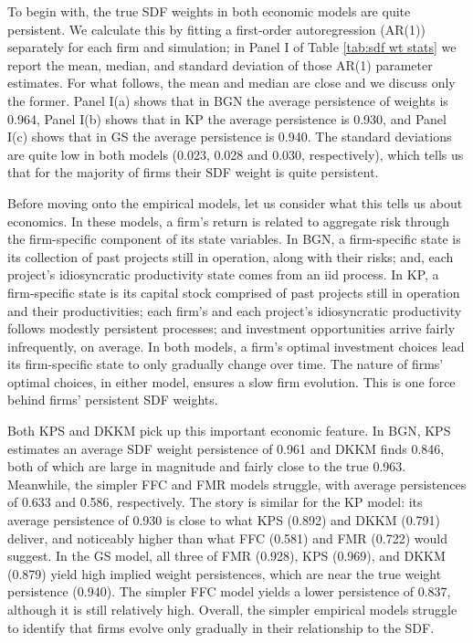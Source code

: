 \documentclass[12pt]{scrarticle}
\begin{document}
To begin with, the true SDF weights in both economic models are quite persistent. We calculate this by fitting a first-order autoregression (AR(1)) separately for each firm and simulation; in Panel I of Table \ref{tab:sdf wt stats} we report the mean, median, and standard deviation of those AR(1) parameter estimates. For what follows, the mean and median are close and we discuss only the former. Panel I(a) shows that in BGN the average persistence of weights is 0.964, Panel I(b) shows that in KP the average persistence is 0.930, and Panel I(c) shows that in GS the average persistence is 0.940. The standard deviations are quite low in both models (0.023, 0.028 and 0.030, respectively), which tells us that for the majority of firms their SDF weight is quite persistent.

Before moving onto the empirical models, let us consider what this tells us about economics. In these models, a firm’s return is related to aggregate risk through the firm-specific component of its state variables. In BGN, a firm-specific state is its collection of past projects still in operation, along with their risks; and, each project's idiosyncratic productivity state comes from an iid process. %
In KP, a firm-specific state is its capital stock comprised of past projects still in operation and their productivities; each firm's and each project's idiosyncratic productivity follows modestly persistent processes; and investment opportunities arrive fairly infrequently, on average. %
In both models, a firm's optimal investment choices lead its firm-specific state to only gradually change over time. The nature of firms' optimal choices, in either model, ensures a slow firm evolution. This is one force behind firms' persistent SDF weights.

Both KPS and DKKM pick up this important economic feature. In BGN, KPS estimates an average SDF weight persistence of 0.961 and DKKM finds 0.846, both of which are large in magnitude and fairly close to the true 0.963. Meanwhile, the simpler FFC and FMR models struggle, with average persistences of 0.633 and 0.586, respectively. The story is similar for the KP model: its average persistence of 0.930 is close to what KPS (0.892) and DKKM (0.791) deliver, and noticeably higher than what FFC (0.581) and FMR (0.722) would suggest. In the GS model, all three of FMR (0.928), KPS (0.969), and DKKM (0.879) yield high implied weight persistences, which are near the true weight persistence (0.940). The simpler FFC model yields a lower persistence of 0.837, although it is still relatively high. Overall, the simpler empirical models struggle to identify that firms evolve only gradually in their relationship to the SDF.
\end{document}
